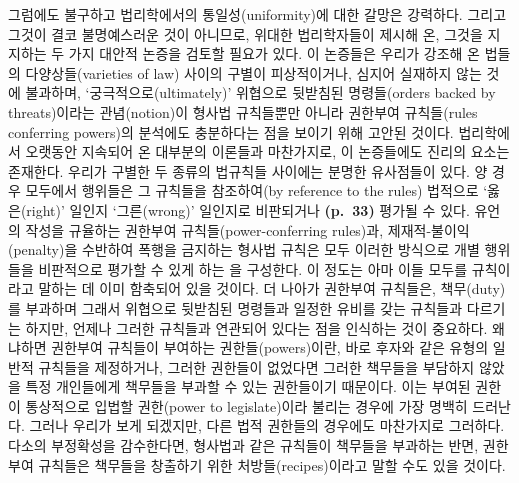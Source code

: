 그럼에도 불구하고 법리학에서의 통일성(uniformity)에 대한 갈망은
강력하다. 그리고 그것이 결코 불명예스러운 것이 아니므로, 위대한
법리학자들이 제시해 온, 그것을 지지하는 두 가지 대안적 논증을 검토할
필요가 있다. 이 논증들은 우리가 강조해 온 법들의 다양상들(varieties of
law) 사이의 구별이 피상적이거나, 심지어 실재하지 않는 것에 불과하며,
‘궁극적으로(ultimately)’ 위협으로 뒷받침된 명령들(orders backed by
threats)이라는 관념(notion)이 형사법 규칙들뿐만 아니라 권한부여
규칙들(rules conferring powers)의 분석에도 충분하다는 점을 보이기 위해
고안된 것이다. 법리학에서 오랫동안 지속되어 온 대부분의 이론들과
마찬가지로, 이 논증들에도 진리의 요소는 존재한다. 우리가 구별한 두
종류의 법규칙들 사이에는 분명한 유사점들이 있다. 양 경우 모두에서
행위들은 그 규칙들을 참조하여(by reference to the rules) 법적으로
‘옳은(right)’ 일인지 ‘그른(wrong)’ 일인지로 비판되거나 \textbf{(p.~33)}
평가될 수 있다. 유언의 작성을 규율하는 권한부여 규칙들(power-conferring
rules)과, 제재적-불이익(penalty)을 수반하여 폭행을 금지하는 형사법
규칙은 모두 이러한 방식으로 개별 행위들을 비판적으로 평가할 수 있게 하는
을 구성한다. 이 정도는 아마 이들 모두를
규칙이라고 말하는 데 이미 함축되어 있을 것이다. 더 나아가 권한부여
규칙들은, 책무(duty)를 부과하며 그래서 위협으로 뒷받침된 명령들과 일정한
유비를 갖는 규칙들과 다르기는 하지만, 언제나 그러한 규칙들과 연관되어
있다는 점을 인식하는 것이 중요하다. 왜냐하면 권한부여 규칙들이 부여하는
권한들(powers)이란, 바로 후자와 같은 유형의 일반적 규칙들을 제정하거나,
그러한 권한들이 없었다면 그러한 책무들을 부담하지 않았을 특정 개인들에게
책무들을 부과할 수 있는 권한들이기 때문이다. 이는 부여된 권한이
통상적으로 입법할 권한(power to legislate)이라 불리는 경우에 가장 명백히
드러난다. 그러나 우리가 보게 되겠지만, 다른 법적 권한들의 경우에도
마찬가지로 그러하다. 다소의 부정확성을 감수한다면, 형사법과 같은
규칙들이 책무들을 부과하는 반면, 권한부여 규칙들은 책무들을 창출하기
위한 처방들(recipes)이라고 말할 수도 있을 것이다.

\subsubsection{\texorpdfstring{}{제재로서의 무효(Nullity as a sanction)}}\label{uxc81cuxc7acuxb85cuxc11cuxc758-uxbb34uxd6a8nullity-as-a-sanction}

